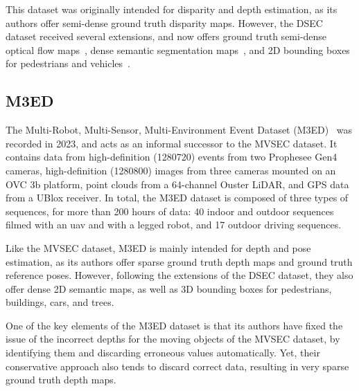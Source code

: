 This dataset was originally intended for disparity and depth estimation, as its authors offer semi-dense ground truth disparity maps. However, the DSEC dataset received several extensions, and now offers ground truth semi-dense optical flow maps~\cite{Gehrig2021DenseOF}, dense semantic segmentation maps~\cite{Sun2022ESSLE}, and 2D bounding boxes for pedestrians and vehicles~\cite{Gehrig2022PushingTL}.

\subsection{M3ED}
The Multi-Robot, Multi-Sensor, Multi-Environment Event Dataset (M3ED)~\cite{Chaney2023M3EDMM} was recorded in 2023, and acts as an informal successor to the MVSEC dataset. It contains data from high-definition (1280\texttimes{}720) events from two Prophesee Gen4 cameras, high-definition (1280\texttimes{}800) images from three cameras mounted on an OVC 3b platform, point clouds from a 64-channel Ouster LiDAR, and GPS data from a UBlox receiver. In total, the M3ED dataset is composed of three types of sequences, for more than 200 hours of data: 40 indoor and outdoor sequences filmed with an \acrshort{uav} and with a legged robot, and 17 outdoor driving sequences.

Like the MVSEC dataset, M3ED is mainly intended for depth and pose estimation, as its authors offer sparse ground truth depth maps and ground truth reference poses. However, following the extensions of the DSEC dataset, they also offer dense 2D semantic maps, as well as 3D bounding boxes for pedestrians, buildings, cars, and trees.

One of the key elements of the M3ED dataset is that its authors have fixed the issue of the incorrect depths for the moving objects of the MVSEC dataset, by identifying them and discarding erroneous values automatically. Yet, their conservative approach also tends to discard correct data, resulting in very sparse ground truth depth maps.
